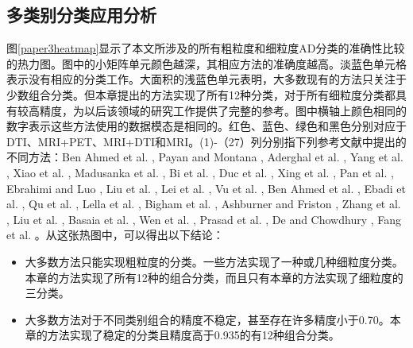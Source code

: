 \subsection{多类别分类应用分析}
图\ref{paper3heatmap}显示了本文所涉及的所有粗粒度和细粒度AD分类的准确性比较的热力图。图中的小矩阵单元颜色越深，其相应方法的准确度越高。淡蓝色单元格表示没有相应的分类工作。大面积的浅蓝色单元表明，大多数现有的方法只关注于少数组合分类。但本章提出的方法实现了所有12种分类，对于所有细粒度分类都具有较高精度，为以后该领域的研究工作提供了完整的参考。图中横轴上颜色相同的数字表示这些方法使用的数据模态是相同的。红色、蓝色、绿色和黑色分别对应于DTI、MRI+PET、MRI+DTI和MRI。(1)-（27）列分别指下列参考文献中提出的不同方法：Ben Ahmed et al. \cite{ahmed2015alzheimer}, Payan and Montana \cite{payan2015predicting}, Aderghal et al. \cite{aderghal2017classification}, Yang et al. \cite{yang2017active}, Xiao et al. \cite{xiao2017brain}, Madusanka et al. \cite{madusanka2019alzheimer}, Bi et al. \cite{bi2020computer}, Duc et al. \cite{duc20203d}, Xing et al. \cite{xing2020dynamic}, Pan et al. \cite{pan2020early}, Ebrahimi and Luo \cite{ebrahimi2021convolutional}, Liu et al. \cite{liu2022diagnosis}, Lei et al. \cite{lei2016discriminative}, Vu et al. \cite{vu2018non}, Ben Ahmed et al. \cite{ahmed2017recognition}, Ebadi et al. \cite{ebadi2017ensemble}, Qu et al. \cite{qu2021ai4ad}, Lella et al. \cite{lella2021ensemble}, Bigham et al. \cite{bigham2022features}, Ashburner and Friston \cite{ashburner2000voxel}, Zhang et al. \cite{zhang2016detecting}, Liu et al. \cite{liu2018joint}, Basaia et al. \cite{2018Automated}, Wen et al. \cite{2020Convolutional}, Prasad et al. \cite{prasad2015brain}, De and Chowdhury \cite{de2021dti}, Fang et al. \cite{Fangmeie2022}。从这张热图中，可以得出以下结论：
\begin{itemize}
    \item 大多数方法只能实现粗粒度的分类。一些方法实现了一种或几种细粒度分类。本章的方法实现了所有12种的组合分类，而且只有本章的方法实现了细粒度的三分类。
    \item 大多数方法对于不同类别组合的精度不稳定，甚至存在许多精度小于0.70。本章的方法实现了稳定的分类且精度高于0.935的有12种组合分类。

\end{itemize}
    
